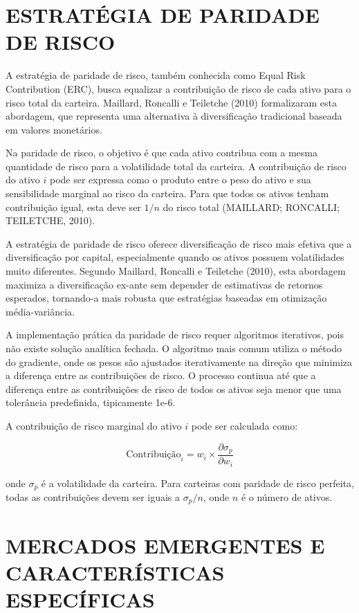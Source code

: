 \section{ESTRATÉGIA DE PARIDADE DE RISCO}

A estratégia de paridade de risco, também conhecida como Equal Risk Contribution (ERC), busca equalizar a contribuição de risco de cada ativo para o risco total da carteira. Maillard, Roncalli e Teiletche (2010) formalizaram esta abordagem, que representa uma alternativa à diversificação tradicional baseada em valores monetários.

Na paridade de risco, o objetivo é que cada ativo contribua com a mesma quantidade de risco para a volatilidade total da carteira. A contribuição de risco do ativo $i$ pode ser expressa como o produto entre o peso do ativo e sua sensibilidade marginal ao risco da carteira. Para que todos os ativos tenham contribuição igual, esta deve ser $1/n$ do risco total (MAILLARD; RONCALLI; TEILETCHE, 2010).

A estratégia de paridade de risco oferece diversificação de risco mais efetiva que a diversificação por capital, especialmente quando os ativos possuem volatilidades muito diferentes. Segundo Maillard, Roncalli e Teiletche (2010), esta abordagem maximiza a diversificação ex-ante sem depender de estimativas de retornos esperados, tornando-a mais robusta que estratégias baseadas em otimização média-variância.

A implementação prática da paridade de risco requer algoritmos iterativos, pois não existe solução analítica fechada. O algoritmo mais comum utiliza o método do gradiente, onde os pesos são ajustados iterativamente na direção que minimiza a diferença entre as contribuições de risco. O processo continua até que a diferença entre as contribuições de risco de todos os ativos seja menor que uma tolerância predefinida, tipicamente 1e-6.

A contribuição de risco marginal do ativo $i$ pode ser calculada como:

\begin{equation}
\text{Contribuição}_i = w_i \times \frac{\partial \sigma_p}{\partial w_i}
\end{equation}

onde $\sigma_p$ é a volatilidade da carteira. Para carteiras com paridade de risco perfeita, todas as contribuições devem ser iguais a $\sigma_p / n$, onde $n$ é o número de ativos.

\section{MERCADOS EMERGENTES E CARACTERÍSTICAS ESPECÍFICAS}

